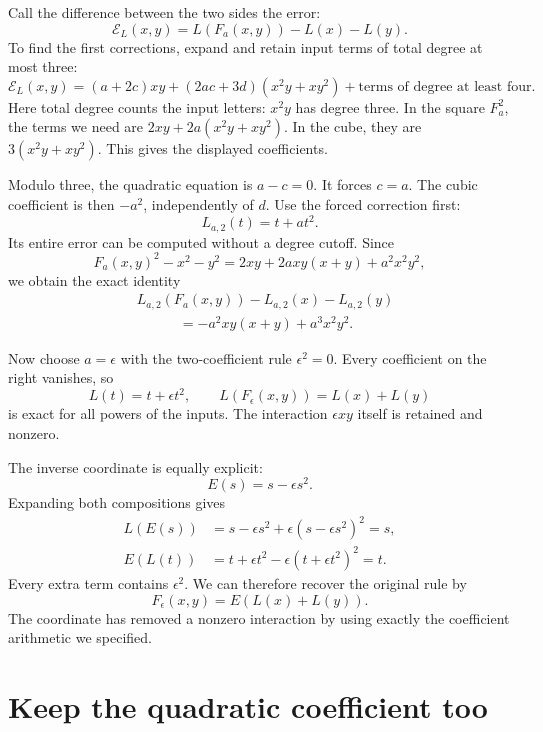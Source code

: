 \documentclass[11pt,letterpaper]{article}
\numberwithin{equation}{section}
\theoremstyle{definition}\newtheorem{example}[theorem]{Example}
\newcommand{\defect}{\mathcal E}
\begin{document}
Call the difference between the two sides the error:
\[
 \defect_L(x,y)=L(F_a(x,y))-L(x)-L(y).
\]
To find the first corrections, expand and retain input terms of total degree at most three:
\begin{equation}\label{eq:first-coefficients}
 \defect_L(x,y)
 =(a+2c)xy+(2ac+3d)(x^2y+xy^2)
 +\text{terms of degree at least four}.
\end{equation}
Here total degree counts the input letters: \(x^2y\) has degree three. In the square \(F_a^2\), the terms we need are \(2xy+2a(x^2y+xy^2)\). In the cube, they are \(3(x^2y+xy^2)\). This gives the displayed coefficients.

Modulo three, the quadratic equation is \(a-c=0\). It forces \(c=a\). The cubic coefficient is then \(-a^2\), independently of \(d\). Use the forced correction first:
\[
 L_{a,2}(t)=t+at^2.
\]
Its entire error can be computed without a degree cutoff. Since
\[
 F_a(x,y)^2-x^2-y^2
 =2xy+2a xy(x+y)+a^2x^2y^2,
\]
we obtain the exact identity
\begin{equation}\label{eq:exact-char3-defect}
 \begin{split}
 &L_{a,2}(F_a(x,y))-L_{a,2}(x)-L_{a,2}(y)\\
 &\hspace{3em}=-a^2xy(x+y)+a^3x^2y^2.
 \end{split}
\end{equation}

Now choose \(a=\epsilon\) with the two-coefficient rule \(\epsilon^2=0\). Every coefficient on the right vanishes, so
\begin{equation}\label{eq:dual-repair}
 L(t)=t+\epsilon t^2,
 \qquad L(F_\epsilon(x,y))=L(x)+L(y)
\end{equation}
is exact for all powers of the inputs. The interaction \(\epsilon xy\) itself is retained and nonzero.

The inverse coordinate is equally explicit:
\[
 E(s)=s-\epsilon s^2.
\]
Expanding both compositions gives
\begin{align*}
 L(E(s))&=s-\epsilon s^2+\epsilon(s-\epsilon s^2)^2=s,\\
 E(L(t))&=t+\epsilon t^2-\epsilon(t+\epsilon t^2)^2=t.
\end{align*}
Every extra term contains \(\epsilon^2\). We can therefore recover the original rule by
\[
 F_\epsilon(x,y)=E(L(x)+L(y)).
\]
The coordinate has removed a nonzero interaction by using exactly the coefficient arithmetic we specified.

\section{Keep the quadratic coefficient too}\label{sec:next-order}
\end{document}
